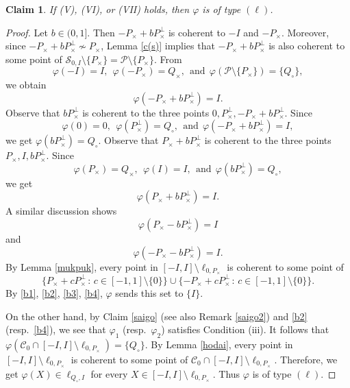 \documentclass[10pt]{amsart}
\newtheorem{claim}[theorem]{Claim}
\theoremstyle{definition}
\theoremstyle{remark}
\numberwithin{subsection}{section}
\numberwithin{equation}{section}
\newcommand\cC{{\mathcal{C}}}
\newcommand\cP{{\mathcal{P}}}
\begin{document}
\begin{claim}\label{vtovii}
If (V), (VI), or (VII) holds, then  $\varphi$ is of type $(\ell)$.
\end{claim}
\begin{proof}
Let $b\in (0, 1]$. 
Then $-P_\times+bP_\times^\perp$ is coherent to $-I$ and $-P_\times$. 
Moreover, since $-P_\times+bP_\times^\perp\not\sim P_\times$, Lemma \ref{c(s)}  implies that $-P_\times+bP_\times^\perp$ is also coherent to some point of ${\mathcal{S}}_{0,I}\setminus \{P_\times\}=\cP\setminus \{P_\times\}$. 
From
\[
\varphi(-I)=I,\ \ \varphi(-P_\times)=Q_\times,\ \ \text{and}\ \ \varphi(\cP\setminus \{P_\times\})=\{Q_\circ\},
\]
we obtain 
\begin{equation}\label{b1}
\varphi(-P_\times+bP_\times^\perp)=I.
\end{equation} 
Observe that $bP_\times^\perp$ is coherent to the three points $0,  P_\times^\perp, -P_\times+bP_\times^\perp$. 
Since 
\[
\varphi(0)=0,\ \ \varphi(P_\times^\perp)=Q_\circ, \ \ \text{and}\ \ \varphi(-P_\times+bP_\times^\perp)=I, 
\]
we get $\varphi(bP_\times^\perp)=Q_\circ$.
Observe that $P_\times +bP_\times^\perp$ is coherent to the three points $P_\times, I, bP_\times^\perp$. 
Since
\[
\varphi(P_\times)=Q_\times,\ \ \varphi(I)=I, \ \ \text{and}\ \ \varphi(bP_\times^\perp)=Q_\circ,
\]
we get 
\begin{equation}\label{b2}
\varphi(P_\times +bP_\times^\perp)=I.
\end{equation} 
A similar discussion shows 
\begin{equation}\label{b3}
\varphi(P_\times-bP_\times^\perp)=I
\end{equation}  
and 
\begin{equation}\label{b4}
\varphi(-P_\times -bP_\times^\perp)=I.
\end{equation} 
By Lemma \ref{mukpuk}, every point in $[-I, I]\setminus \ell_{0, P_{\times}}$ is coherent to some point of 
\[
\{P_{\times}+cP_{\times}^\perp\,:\, c\in [-1,1]\setminus\{0\}\} \cup \{-P_{\times}+cP_{\times}^\perp\,:\, c\in [-1,1]\setminus\{0\}\}.
\] 
By \eqref{b1}, \eqref{b2}, \eqref{b3}, \eqref{b4}, $\varphi$ sends this set to $\{I\}$.

On the other hand, by  Claim \ref{saigo} (see also Remark \ref{saigo2}) and \eqref{b2} (resp.\ \eqref{b4}), we see that $\varphi_1$ (resp.\ $\varphi_2$) satisfies Condition (iii).
It follows that $\varphi(\cC_0\cap [-I, I]\setminus \ell_{0, P_{\times}})=\{Q_{\circ}\}$. 
By Lemma \ref{hodai}, every point in $[-I, I]\setminus \ell_{0, P_{\times}}$ is coherent to some point of $\cC_0\cap [-I, I]\setminus \ell_{0, P_{\times}}$.
Therefore, we get $\varphi(X)\in \ell_{Q_{\circ}, I}$ for every $X\in [-I, I]\setminus \ell_{0, P_{\times}}$. 
Thus $\varphi$ is of type $(\ell)$.
\end{proof}
\end{document}
